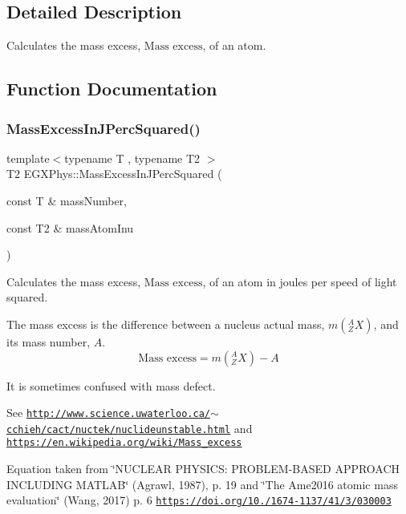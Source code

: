 \subsection{Detailed Description}
Calculates the mass excess, $\text{Mass excess}$, of an atom. 

\subsection{Function Documentation}
\mbox{\label{group___mass_excess_ga3eb487f438543e950b9c5aece4c5b409}} 
\subsubsection{\texorpdfstring{Mass\+Excess\+In\+J\+Perc\+Squared()}{MassExcessInJPercSquared()}}
{\footnotesize\ttfamily template$<$typename T , typename T2 $>$ \\
T2 E\+G\+X\+Phys\+::\+Mass\+Excess\+In\+J\+Perc\+Squared (\begin{DoxyParamCaption}\item[{const T \&}]{mass\+Number,  }\item[{const T2 \&}]{mass\+Atom\+Inu }\end{DoxyParamCaption})}



Calculates the mass excess, $\text{Mass excess}$, of an atom in joules per speed of light squared. 

The mass excess is the difference between a nucleus actual mass, $m({^A_ZX})$, and its mass number, $A$. \[\text{Mass excess} = m({^A_ZX}) - A\]

It is sometimes confused with mass defect.

See \href{http://www.science.uwaterloo.ca/~cchieh/cact/nuctek/nuclideunstable.html}{\tt http\+://www.\+science.\+uwaterloo.\+ca/$\sim$cchieh/cact/nuctek/nuclideunstable.\+html} and \href{https://en.wikipedia.org/wiki/Mass_excess}{\tt https\+://en.\+wikipedia.\+org/wiki/\+Mass\+\_\+excess}

Equation taken from \char`\"{}\+N\+U\+C\+L\+E\+A\+R P\+H\+Y\+S\+I\+C\+S\+: P\+R\+O\+B\+L\+E\+M-\/\+B\+A\+S\+E\+D A\+P\+P\+R\+O\+A\+C\+H I\+N\+C\+L\+U\+D\+I\+N\+G M\+A\+T\+L\+A\+B\char`\"{} (Agrawl, 1987), p. 19 and \char`\"{}\+The Ame2016 atomic mass evaluation\char`\"{} (Wang, 2017) p. 6 \href{https://doi.org/10.1088/1674-1137/41/3/030003}{\tt https\+://doi.\+org/10./1674-\/1137/41/3/030003}



